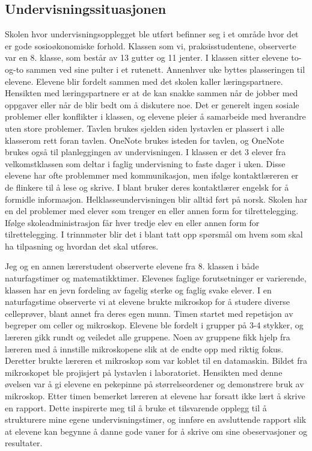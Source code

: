 \documentclass[main.tex]{subfiles}
\begin{document}
\subsection*{Undervisningssituasjonen}
Skolen hvor undervisningsopplegget ble utført befinner seg i et område hvor det er gode sosioøkonomiske forhold. 
Klassen som vi, praksisstudentene, observerte var en 8. klasse, som består av 13 gutter og 11 jenter. 
I klassen sitter elevene to-og-to sammen ved sine pulter i et rutenett. Annenhver uke byttes plasseringen til elevene. 
Elevene blir fordelt sammen med det skolen kaller læringspartnere. Hensikten med læringspartnere er at de kan snakke
sammen når de jobber med oppgaver eller når de blir bedt om å diskutere noe.  Det er generelt ingen sosiale problemer 
eller konflikter i klassen, og elevene pleier å samarbeide med hverandre uten store problemer. Tavlen brukes sjelden 
siden lystavlen er plassert i alle klasserom rett foran tavlen. OneNote brukes isteden for tavlen, og OneNote brukes 
også til planleggingen av undervisningen. I klassen er det 3 elever fra velkomstklassen som deltar i faglig undervisning 
to faste dager i uken. Disse elevene har ofte problemmer med kommunikasjon, men ifølge kontaktlæreren er de flinkere 
til å lese og skrive. I blant bruker deres kontaktlærer engelsk for å formidle informasjon. Helklasseundervisningen 
blir alltid ført på norsk. Skolen har en del problemer med elever som trenger en eller annen form for tilrettelegging. 
Ifølge skoleadministrasjon får hver tredje elev en eller annen form for tilrettelegging. I trinnmøter blir 
det i blant tatt opp spørsmål om hvem som skal ha tilpasning og hvordan det skal utføres.
\newline

Jeg og en annen lærerstudent observerte elevene fra 8. klassen i både naturfagstimer og matematikktimer. 
Elevenes faglige forutsetninger er varierende, klassen har en jevn fordeling av fagelig sterke og faglig 
svake elever. I en naturfagstime observerte vi at elevene brukte mikroskop for å studere diverse celleprøver, 
blant annet fra deres egen munn. Timen startet med repetisjon av begreper om celler og mikroskop. Elevene 
ble fordelt i grupper på 3-4 stykker, og læreren gikk rundt og veiledet alle gruppene. Noen av gruppene fikk 
hjelp fra læreren med å innstille mikroskopene slik at de endte opp med riktig fokus. Deretter brukte læreren 
et mikroskop som var koblet til en datamaskin. Bildet fra mikroskopet ble projisjert på lystavlen i laboratoriet.
Hensikten med denne øvelsen var å gi elevene en pekepinne på størrelseordener og demonstrere bruk av mikroskop. 
Etter timen bemerket læreren at elevene har forsatt ikke lært å skrive en rapport. Dette inspirerte meg til å 
bruke et tilsvarende opplegg til å strukturere mine egene undervisningstimer, og innføre en avsluttende rapport 
slik at elevene kan begynne å danne gode vaner for å skrive om sine obeservasjoner og resultater.

\end{document}
